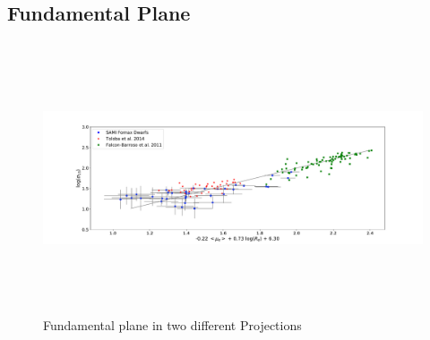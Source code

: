 \documentclass{aa}
\begin{document}
\subsection{Fundamental Plane}
\begin{figure}[!htb]
   \centering
  \includegraphics[width=20cm,height=8cm,keepaspectratio]{../2_pipeline/2_FP_LAD_onlydE+useLiter/rev_FP_LAD+Liter_x=logS_DWARF.pdf}
         \caption{Fundamental plane in two different Projections}
         \label{fig:FP}
\end{figure}
\end{document}

